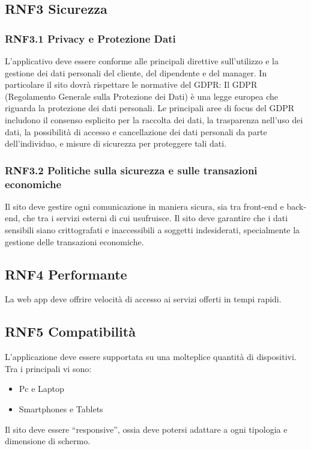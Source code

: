 \documentclass{report}
\begin{document}
\subsection*{RNF3 Sicurezza}
\subsubsection*{RNF3.1 Privacy e Protezione Dati}
L’applicativo deve essere conforme alle principali direttive sull’utilizzo e la gestione dei dati personali del cliente, del dipendente e del manager. In particolare il sito dovrà rispettare le normative del GDPR:
Il GDPR (Regolamento Generale sulla Protezione dei Dati) è una legge europea che riguarda la protezione dei dati personali.
Le principali aree di focus del GDPR includono il consenso esplicito per la raccolta dei dati, la trasparenza nell'uso dei dati, la possibilità di accesso e cancellazione dei dati personali da parte dell'individuo, e misure di sicurezza per proteggere tali dati. 

\subsubsection{RNF3.2 Politiche sulla sicurezza e sulle transazioni economiche}
Il sito deve gestire ogni comunicazione in maniera sicura, sia tra front-end e back-end, che tra i servizi esterni di cui usufruisce. 
Il sito deve garantire che i dati sensibili siano crittografati e inaccessibili a soggetti indesiderati, specialmente la gestione delle transazioni economiche.

\subsection*{RNF4 Performante}
La web app deve offrire velocità di accesso ai servizi offerti in tempi rapidi.

\subsection*{RNF5 Compatibilità}
L’applicazione deve essere supportata su una molteplice quantità di dispositivi.
Tra i principali vi sono:
\begin{itemize}
	\item Pc e Laptop
	\item Smartphones e Tablets
\end{itemize}
Il sito deve essere “responsive”, ossia deve potersi adattare a ogni tipologia e dimensione di schermo.
\end{document}
